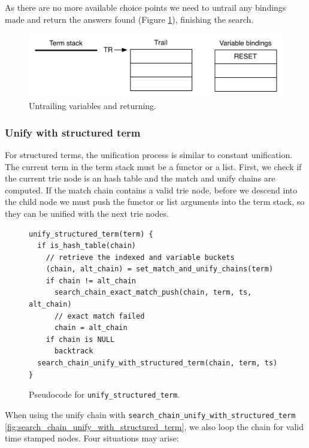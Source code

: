 As there are no more available choice points we need to untrail any bindings made and return
the answers found (Figure \ref{fig:collect_ex6}), finishing the search.

\begin{figure}[H]
  \centering
    \includegraphics[scale=0.6]{collect_ex6.pdf}
  \caption{Untrailing variables and returning.}
  \label{fig:collect_ex6}
\end{figure}

\subsubsection{Unify with structured term}

For structured terms, the unification process is similar to constant unification. The
current term in the term stack must be a functor or a list. First, we check if the current
trie node is an hash table and the match and unify chains are computed.
If the match chain contains a valid trie node, before we descend into the child
node we must push the functor or list arguments into the term stack, so they can
be unified with the next trie nodes.

\begin{figure}[H]
\begin{Verbatim}[fontsize=\small]
unify_structured_term(term) {
  if is_hash_table(chain)
    // retrieve the indexed and variable buckets
    (chain, alt_chain) = set_match_and_unify_chains(term)
    if chain != alt_chain
      search_chain_exact_match_push(chain, term, ts, alt_chain)
      // exact match failed
      chain = alt_chain
    if chain is NULL
      backtrack
  search_chain_unify_with_structured_term(chain, term, ts)
}
\end{Verbatim}
\caption{Pseudo\-code for \texttt{unify\_structured\_term}.}
\label{fig:unify_structured_term}
\end{figure}

When using the unify chain with \texttt{search\_chain\_unify\_with\_structured\_term}
\ref{fig:search_chain_unify_with_structured_term},
we also loop the chain for valid time stamped nodes.
Four situations may arise:

